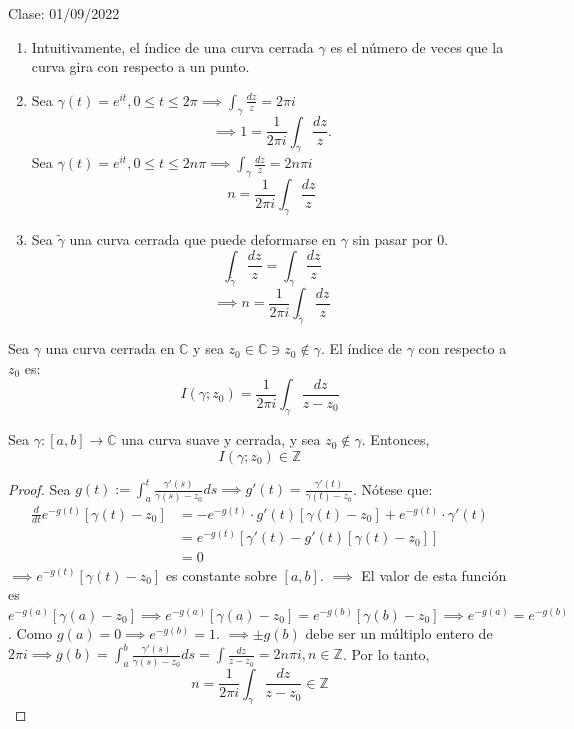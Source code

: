 Clase: 01/09/2022

\begin{nota}
    \begin{enumerate}
    \item Intuitivamente, el índice de una curva cerrada $\gamma$ es el número de veces que la curva gira con respecto a un punto.
    \item Sea $\gamma(t)=e^{it},0\leq t\leq 2\pi\implies \int_\gamma \frac{dz}{z}=2\pi i$
    $$\implies 1=\frac{1}{2\pi i}\int_\gamma \frac{dz}{z}.$$ Sea $\gamma(t)=e^{it},0\leq t\leq 2n\pi \implies \int_\gamma \frac{dz}{z}=2n\pi i$
    $$n=\frac{1}{2\pi i}\int_\gamma \frac{dz}{z}$$
    \item Sea $\tilde{\gamma}$ una curva cerrada que puede deformarse en $\gamma$ sin pasar por 0. 
    $$\int_{\tilde{\gamma}}\frac{dz}{z}=\int_\gamma \frac{dz}{z}$$
    $$\implies n=\frac{1}{2\pi i}\int_{\tilde{\gamma}}\frac{dz}{z}$$
\end{enumerate}
     
\end{nota}

\begin{definicion}
    Sea $\gamma$ una curva cerrada en $\mathbb{C}$ y sea $z_0\in \mathbb{C}\ni z_0\not\in \gamma$. El índice de $\gamma$ con respecto a $z_0$ es: 
    $$I(\gamma;z_0)=\frac{1}{2\pi i}\int_\gamma \frac{dz}{z-z_0}$$
\end{definicion}

\begin{teorema}
    Sea $\gamma:[a,b]\to\mathbb{C}$ una curva suave y cerrada, y sea $z_0\not\in\gamma$. Entonces, 
    $$I(\gamma;z_0)\in\mathbb{Z}$$
    \begin{proof}
        Sea $g(t):=\int_a^t\frac{\gamma'(s)}{\gamma(s)-z_0}ds\implies g'(t)=\frac{\gamma'(t)}{\gamma(t)-z_0}$. Nótese que: 
        \begin{align*}
            \frac{d}{dt}e^{-g(t)}\left[\gamma(t)-z_0\right] &=-e^{-g(t)}\cdot g'(t)\left[
                \gamma(t)-z_0\right] +e^{-g(t)}\cdot \gamma'(t)\\
                &= e^{-g(t)}\left[\gamma'(t)-g'(t)[\gamma(t)-z_0]\right]\\
                &= 0
        \end{align*}
        $\implies e^{-g(t)}[\gamma(t)-z_0]$ es constante sobre $[a,b]$. $\implies$ El valor de esta función es $e^{-g(a)}[\gamma(a)-z_0]\implies e^{-g(a)}[\gamma(a)-z_0]=e^{-g(b)}[\gamma(b)-z_0]\implies e^{-g(a)}=e^{-g(b)}$. Como $g(a)=0\implies e^{-g(b)}=1$. $\implies \pm g(b)$ debe ser un múltiplo entero de $2\pi i\implies g(b)=\int_a^b\frac{\gamma'(s)}{\gamma(s)-z_0}ds=\int\frac{dz}{z-z_0}=2n\pi i,n\in\mathbb{Z}$. Por lo tanto, 
        $$n=\frac{1}{2\pi i}\int_\gamma \frac{dz}{z-z_0}\in \mathbb{Z}$$
    \end{proof}
\end{teorema}

